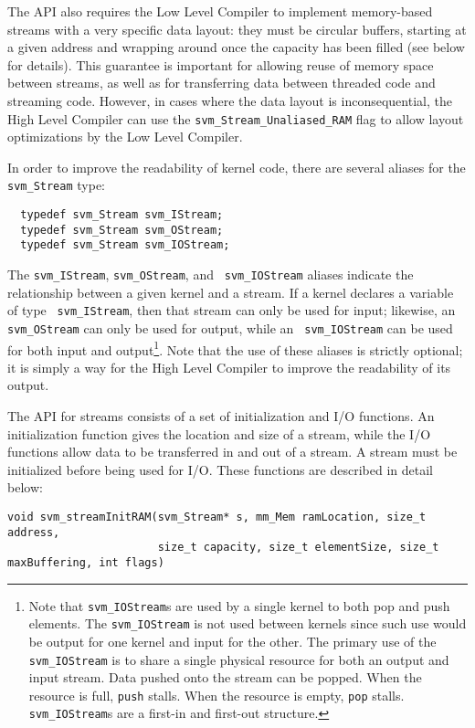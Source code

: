 The API also requires the Low Level Compiler to implement memory-based
streams with a very specific data layout: they must be circular
buffers, starting at a given address and wrapping around once the
capacity has been filled (see below for details).  This guarantee is
important for allowing reuse of memory space between streams, as well
as for transferring data between threaded code and streaming code.
However, in cases where the data layout is inconsequential, the High
Level Compiler can use the {\tt svm\_Stream\_Unaliased\_RAM} flag to allow
layout optimizations by the Low Level Compiler.

In order to improve the readability of kernel code, there are several
aliases for the {\tt svm\_Stream} type:
{\small
\begin{verbatim}
  typedef svm_Stream svm_IStream;
  typedef svm_Stream svm_OStream;
  typedef svm_Stream svm_IOStream;
\end{verbatim}}
\noindent The {\tt svm\_IStream}, {\tt svm\_OStream}, and {\tt
svm\_IOStream} aliases indicate the relationship between a given
kernel and a stream.  If a kernel declares a variable of type {\tt
svm\_IStream}, then that stream can only be used for input; likewise,
an {\tt svm\_OStream} can only be used for output, while an {\tt
svm\_IOStream} can be used for both input and output\footnote{Note
that {\tt svm\_IOStream}s are used by a single kernel to both pop and
push elements.  The {\tt svm\_IOStream} is not used between kernels
since such use would be output for one kernel and input for the
other. The primary use of the {\tt svm\_IOStream} is to share a single
physical resource for both an output and input stream.  Data pushed
onto the stream can be popped.  When the resource is full, {\tt push}
stalls.  When the resource is empty, {\tt pop} stalls.  {\tt
svm\_IOStream}s are a first-in and first-out structure.}.  Note that
the use of these aliases is strictly optional; it is simply a way for
the High Level Compiler to improve the readability of its output.

The API for streams consists of a set of initialization and I/O
functions.  An initialization function gives the location and size of
a stream, while the I/O functions allow data to be transferred in and
out of a stream.  A stream must be initialized before being used for
I/O.  These functions are described in detail below:
\clearpage
~ \\ \vspace{-24pt} 
\makeline
{}
{\small
\begin{verbatim}
void svm_streamInitRAM(svm_Stream* s, mm_Mem ramLocation, size_t address, 
                       size_t capacity, size_t elementSize, size_t maxBuffering, int flags)
\end{verbatim}}

